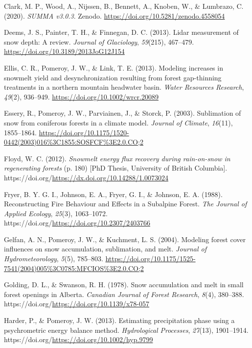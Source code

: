 \documentclass[
  letterpaper,
  DIV=11,
  numbers=noendperiod]{scrartcl}
\newlength{\cslhangindent}
\newenvironment{CSLReferences}[2] %
 {\begin{list}{}{%
  \setlength{\itemindent}{0pt}
  \setlength{\leftmargin}{0pt}
  \setlength{\parsep}{0pt}
  \ifodd #1
   \setlength{\leftmargin}{\cslhangindent}
   \setlength{\itemindent}{-1\cslhangindent}
  \fi
  \setlength{\itemsep}{#2\baselineskip}}}
 {\end{list}}
\begin{document}
\begin{CSLReferences}{1}{0}
Clark, M. P., Wood, A., Nijssen, B., Bennett, A., Knoben, W., \&
Lumbrazo, C. (2020). \emph{{SUMMA v3.0.3}}. Zenodo.
\url{https://doi.org/10.5281/zenodo.4558054}

Deems, J. S., Painter, T. H., \& Finnegan, D. C. (2013). {Lidar
measurement of snow depth: A review}. \emph{Journal of Glaciology},
\emph{59}(215), 467--479. \url{https://doi.org/10.3189/2013JoG12J154}

Ellis, C. R., Pomeroy, J. W., \& Link, T. E. (2013). {Modeling increases
in snowmelt yield and desynchronization resulting from forest
gap-thinning treatments in a northern mountain headwater basin}.
\emph{Water Resources Research}, \emph{49}(2), 936--949.
\url{https://doi.org/10.1002/wrcr.20089}

Essery, R., Pomeroy, J. W., Parviainen, J., \& Storck, P. (2003).
{Sublimation of snow from coniferous forests in a climate model}.
\emph{Journal of Climate}, \emph{16}(11), 1855--1864.
\url{https://doi.org/10.1175/1520-0442(2003)016\%3C1855:SOSFCF\%3E2.0.CO;2}

Floyd, W. C. (2012). \emph{{Snowmelt energy flux recovery during
rain-on-snow in regenerating forests}} (p. 180) {[}PhD Thesis,
University of British Columbia{]}.
https://doi.org/\url{https://dx.doi.org/10.14288/1.0073024}

Fryer, B. Y. G. I., Johnson, E. A., Fryer, G. I., \& Johnson, E. A.
(1988). {Reconstructing Fire Behaviour and Effects in a Subalpine
Forest}. \emph{The Journal of Applied Ecology}, \emph{25}(3),
1063--1072. https://doi.org/\url{https://doi.org/10.2307/2403766}

Gelfan, A. N., Pomeroy, J. W., \& Kuchment, L. S. (2004). {Modeling
forest cover influences on snow accumulation, sublimation, and melt}.
\emph{Journal of Hydrometeorology}, \emph{5}(5), 785--803.
\url{https://doi.org/10.1175/1525-7541(2004)005\%3C0785:MFCIOS\%3E2.0.CO;2}

Golding, D. L., \& Swanson, R. H. (1978). {Snow accumulation and melt in
small forest openings in Alberta}. \emph{Canadian Journal of Forest
Research}, \emph{8}(4), 380--388.
https://doi.org/\url{https://doi.org/10.1139/x78-057}

Harder, P., \& Pomeroy, J. W. (2013). {Estimating precipitation phase
using a psychrometric energy balance method}. \emph{Hydrological
Processes}, \emph{27}(13), 1901--1914.
https://doi.org/\url{https://doi.org/10.1002/hyp.9799}


\end{CSLReferences}
\end{document}
